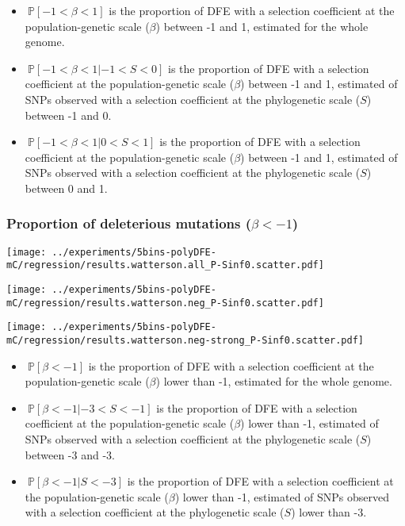 \documentclass{article}
\newcommand{\proba}{\mathbb{P}}
\newcommand{\Sphy}{S}
\newcommand{\divStrongDel}{\Sphy < -3}
\newcommand{\divDel}{-3 < \Sphy < -1}
\newcommand{\divWeakDel}{-1 < \Sphy < 0}
\newcommand{\divWeakAdv}{0 < \Sphy < 1}
\newcommand{\Spop}{\beta}
\newcommand{\polyDel}{\Spop < -1}
\newcommand{\polyNeutral}{-1 < \Spop < 1}
\begin{document}
    \begin{itemize}
        \item $\ \proba [ \polyNeutral ]$ is the proportion of DFE with a selection coefficient at the population-genetic scale ($\Spop$) between -1 and 1, estimated for the whole genome.
        \item $\ \proba [ \polyNeutral | \divWeakDel]$ is the proportion of DFE with a selection coefficient at the population-genetic scale ($\Spop$) between -1 and 1, estimated of SNPs observed with a selection coefficient at the phylogenetic scale ($\Sphy$) between -1 and 0.
        \item $\ \proba [ \polyNeutral | \divWeakAdv ]$ is the proportion of DFE with a selection coefficient at the population-genetic scale ($\Spop$) between -1 and 1, estimated of SNPs observed with a selection coefficient at the phylogenetic scale ($\Sphy$) between 0 and 1.
    \end{itemize}

    \subsubsection{Proportion of deleterious mutations ($\polyDel$)}

    \begin{minipage}{0.32\linewidth}
        \texttt{[image: ../experiments/5bins-polyDFE-mC/regression/results.watterson.all\_P-Sinf0.scatter.pdf]}
    \end{minipage}
    \begin{minipage}{0.32\linewidth}
        \texttt{[image: ../experiments/5bins-polyDFE-mC/regression/results.watterson.neg\_P-Sinf0.scatter.pdf]}
    \end{minipage}
    \begin{minipage}{0.32\linewidth}
        \texttt{[image: ../experiments/5bins-polyDFE-mC/regression/results.watterson.neg-strong\_P-Sinf0.scatter.pdf]}
    \end{minipage}

    \begin{itemize}
        \item $\ \proba [ \polyDel ]$ is the proportion of DFE with a selection coefficient at the population-genetic scale ($\Spop$) lower than -1, estimated for the whole genome.
        \item $\ \proba [ \polyDel | \divDel]$ is the proportion of DFE with a selection coefficient at the population-genetic scale ($\Spop$) lower than -1, estimated of SNPs observed with a selection coefficient at the phylogenetic scale ($\Sphy$) between -3 and -3.
        \item $\ \proba [ \polyDel | \divStrongDel ]$ is the proportion of DFE with a selection coefficient at the population-genetic scale ($\Spop$) lower than -1, estimated of SNPs observed with a selection coefficient at the phylogenetic scale ($\Sphy$) lower than -3.
    \end{itemize}
\end{document}

